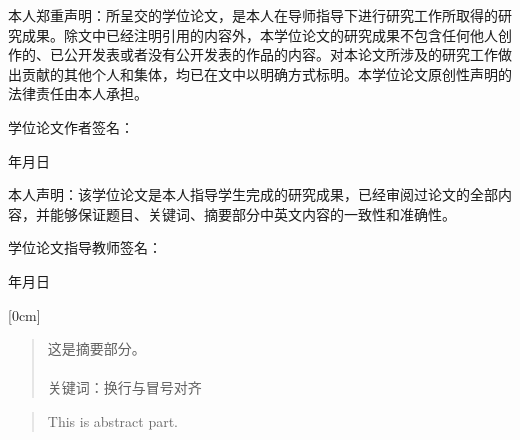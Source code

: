 \documentclass[12pt]{ctexart}
\begin{document}
\begin{spacing}{1.5}
本人郑重声明：所呈交的学位论文，是本人在导师指导下进行研究工作所取得的研究成果。除文中已经注明引用的内容外，本学位论文的研究成果不包含任何他人创作的、已公开发表或者没有公开发表的作品的内容。对本论文所涉及的研究工作做出贡献的其他个人和集体，均已在文中以明确方式标明。本学位论文原创性声明的法律责任由本人承担。

\qquad\qquad\qquad\qquad\qquad 学位论文作者签名：\qquad\qquad 

\qquad\qquad\qquad\qquad\qquad\qquad\qquad\qquad\qquad\qquad 年\qquad 月\qquad 日

本人声明：该学位论文是本人指导学生完成的研究成果，已经审阅过论文的全部内容，并能够保证题目、关键词、摘要部分中英文内容的一致性和准确性。

\qquad\qquad\qquad\qquad 学位论文指导教师签名：\qquad\qquad 

\qquad\qquad\qquad\qquad\qquad\qquad\qquad\qquad\qquad\qquad 年\qquad 月\qquad 日
\clearpage
\fancyhf{}%
\setcounter{page}{1}
\pagestyle{fancy}



\lhead{}  \rhead{}
\lfoot{} \cfoot{\thepage} \rfoot{}
\renewcommand\headrulewidth{0.3pt}





\renewcommand{\abstractname}{\heiti \zihao{-3} 摘\quad 要}
[0cm]%
{\songti{}}
{\contentslabel{4em}}%
{}%
{\titlerule*[0.5pc]{$\cdot$}\contentspage \hspace*{0cm}}%
\begin{abstract}
	\songti {}这是摘要部分。\\
	\ \\
	\heiti {}关键词：\songti {}换行与冒号对齐
\end{abstract}
\clearpage%
\lhead{}  \rhead{}
\renewcommand{\abstractname}{\heiti \zihao{-3} Abstract}
\begin{abstract}
	\setmainfont{Times New Roman}
	This is abstract part.
	

\end{abstract}
\end{spacing}
\end{document}
